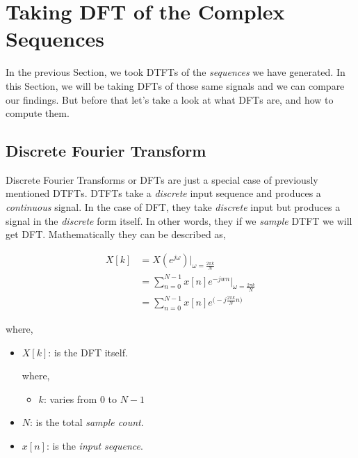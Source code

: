 \documentclass[../../course]{subfiles}
\begin{document}
\def\freqXOne{28}
\def\freqXTwo{56}
\def\freqXThree{56.1}

\def\sampFreqMuchLess{\textbf{(a):} $f_{s} = \frac{4 \times 28}{2} = 56 \si{Hz}$}
\def\sampFreqNorm{\textbf{(b):} $f_{s} = 4 \times 28 = 112 \si{Hz}$}
\def\sampFreqSligGreat{\textbf{(c):} $f_{s} = (4 \times 28) + 10 = 122 \si{Hz}$}
\def\sampFreqMuchGreat{\textbf{(d):} $f_{s} = 4 \times 28 \times 6 = 672 \si{Hz}$}

\section{Taking DFT of the Complex Sequences} \label{sec:wrkTakingDFTCplxSeqs}

In the previous Section, we took \textsc{DTFT}s of the \emph{sequences} we have
generated. In this Section, we will be taking \textsc{DFT}s of those same signals
and we can compare our findings. But before that let's take a look at what \textsc{DFT}s
are, and how to compute them.

\subsection{Discrete Fourier Transform}

Discrete Fourier Transforms or \textsc{DFT}s are just a special case of previously
mentioned \textsc{DTFT}s. \textsc{DTFT}s take a \emph{discrete} input sequence and
produces a \emph{continuous} signal. In the case of \textsc{DFT}, they take \emph{discrete}
input but produces a signal in the \emph{discrete} form itself. In other words, they
if we \emph{sample} \textsc{DTFT} we will get \textsc{DFT}. Mathematically they can
be described as,

\begin{align}
    X[k] &= X(e^{j\omega}) |_{\omega = \frac{2 \pi k}{N}} \\
    &= \sum_{n = 0}^{N - 1} x[n] e^{-j w n} \bigg|_{\omega = \frac{2 \pi k}{N}} \\
    &= \sum_{n = 0}^{N - 1} x[n] e^{\big(-j \frac{2 \pi k}{N} n \big)} \label{eqn:dftK}
\end{align}

where,

\begin{itemize} [label=]
    \item $X[k]$: is the \textsc{DFT} itself.

        where,

        \begin{itemize} [label=]
            \item $k$: varies from $0$ to $N - 1$
        \end{itemize}

    \item $N$: is the total \emph{sample count}.
    \item $x[n]$: is the \emph{input sequence}.

\end{itemize}
\end{document}
